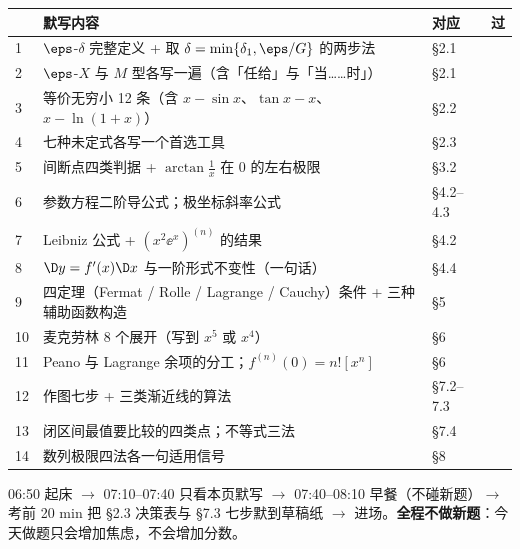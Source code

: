 \documentclass[UTF8,11pt]{ctexart}
\newcommand{\cb}{\raisebox{0.15ex}{\fbox{\rule{0pt}{1.05ex}\rule{1.05ex}{0pt}}}}
\begin{document}
\vspace{4pt}
\begin{center}
\renewcommand{\arraystretch}{1.55}
\begin{tabular}{@{}p{0.7cm}p{9.6cm}p{2.6cm}p{1.6cm}@{}}
\toprule
 & \textbf{默写内容} & \textbf{对应} & \textbf{过} \\
\midrule
1 & $\eps$-$\delta$ 完整定义 + 取 $\delta=\min\{\delta_1,\eps/G\}$ 的两步法 & §2.1 & \cb \\
2 & $\eps$-$X$ 与 $M$ 型各写一遍（含「任给」与「当……时」） & §2.1 & \cb \\
3 & 等价无穷小 12 条（含 $x-\sin x$、$\tan x-x$、$x-\ln(1+x)$） & §2.2 & \cb \\
4 & 七种未定式各写一个首选工具 & §2.3 & \cb \\
5 & 间断点四类判据 + $\arctan\frac1x$ 在 $0$ 的左右极限 & §3.2 & \cb \\
6 & 参数方程二阶导公式；极坐标斜率公式 & §4.2--4.3 & \cb \\
7 & Leibniz 公式 + $(x^2\ee^x)^{(n)}$ 的结果 & §4.2 & \cb \\
8 & $\D y=f'(x)\D x$ 与一阶形式不变性（一句话） & §4.4 & \cb \\
9 & 四定理（Fermat / Rolle / Lagrange / Cauchy）条件 + 三种辅助函数构造 & §5 & \cb \\
10 & 麦克劳林 8 个展开（写到 $x^5$ 或 $x^4$） & §6 & \cb \\
11 & Peano 与 Lagrange 余项的分工；$f^{(n)}(0)=n![x^n]$ & §6 & \cb \\
12 & 作图七步 + 三类渐近线的算法 & §7.2--7.3 & \cb \\
13 & 闭区间最值要比较的四类点；不等式三法 & §7.4 & \cb \\
14 & 数列极限四法各一句适用信号 & §8 & \cb \\
\bottomrule
\end{tabular}
\end{center}

\vspace{6pt}
\begin{keypoint}[11/11 当天时间线]
06:50 起床 $\to$ 07:10--07:40 只看本页默写 $\to$ 07:40--08:10 早餐（不碰新题）$\to$ 考前 20 min 把 §2.3 决策表与 §7.3 七步默到草稿纸 $\to$ 进场。\textbf{全程不做新题}：今天做题只会增加焦虑，不会增加分数。
\end{keypoint}

\vspace{4pt}
\end{document}
